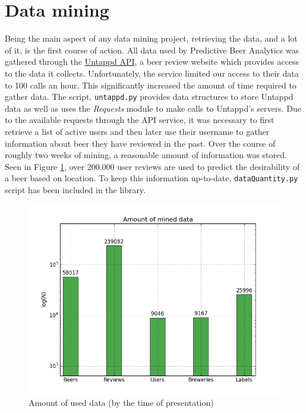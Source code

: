 \documentclass[10pt]{IEEEtran}
\begin{document}
\section{Data mining}
Being the main aspect of any data mining project, retrieving the data, and a lot of it, is the first course of action. All data used by Predictive Beer Analytics was gathered through the \href{https://untappd.com/api/docs}{Untappd API}, a beer review website which provides access to the data it collects. Unfortunately, the service limited our access to their data to 100 calls an hour. This significantly increased the amount of time required to gather data. The script, \texttt{untappd.py} provides data structures to store Untappd data as well as uses the \textit{Requests} module to make calls to Untappd's servers. Due to the available requests through the API service, it was necessary to first retrieve a list of active users and then later use their username to gather information about beer they have reviewed in the past. Over the course of roughly two weeks of mining, a reasonable amount of information was stored. Seen in Figure \ref{fig:dataQuantity}, over 200.000 user reviews are used to predict the desirability of a beer based on location. To keep this information up-to-date, \texttt{dataQuantity.py} script has been included in the library. 

\begin{figure}[h]
  \centering
  \includegraphics[width=\columnwidth]{./graphics/quantity.png}
  \caption{Amount of used data (by the time of presentation)}
  \label{fig:dataQuantity}
\end{figure}
\end{document}
